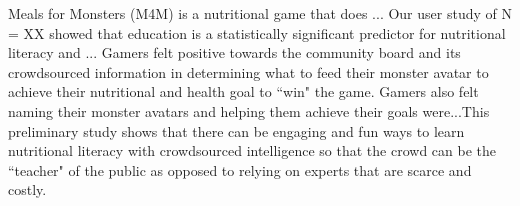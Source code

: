 Meals for Monsters (M4M) is a nutritional game that does ... Our user study of N = XX showed that education is a statistically significant predictor for nutritional literacy and ... Gamers felt positive towards the community board and its crowdsourced information in determining what to feed their monster avatar to achieve their nutritional and health goal to ``win" the game. Gamers also felt naming their monster avatars and helping them achieve their goals were...This preliminary study shows that there can be engaging and fun ways to learn nutritional literacy with crowdsourced intelligence so that the crowd can be the ``teacher" of the public as opposed to relying on experts that are scarce and costly. 